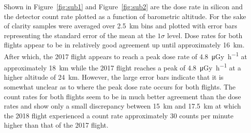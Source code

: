 Shown in Figure~\ref{fig:sub1} and Figure~\ref{fig:sub2} are the dose rate in silicon and the detector count rate plotted as a function of barometric altitude. For the sake of clarity samples were averaged over \SI{2.5}{\kilo\meter} bins and plotted with error bars representing the standard error of the mean at the $1\sigma$ level. Dose rates for both flights appear to be in relatively good agreement up until approximately \SI{16}{\kilo\meter}. After which, the 2017 flight appears to reach a peak dose rate of \SI{4.8}{\micro\gray\per\hour} at approximately \SI{18}{\kilo\meter} while the 2017 flight reaches a peak of \SI{4.8}{\micro\gray\per\hour} at a higher altitude of \SI{24}{\kilo\meter}. 
%
However, the large error bars indicate that it is somewhat unclear as to where the peak dose rate occurs for both flights. %
%
The count rates for both flights seem to be in much better agreement than the dose rates and show only a small discrepancy between \SI{15}{\kilo\meter} and \SI{17.5}{\kilo\meter} at which the 2018 flight experienced a count rate approximately 30 counts per minute higher than that of the 2017 flight. %
